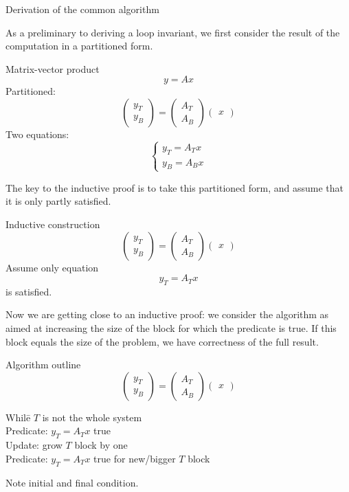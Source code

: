 {Derivation of the common algorithm}

As a preliminary to deriving a loop invariant, we first consider
the result of the computation in a partitioned form.

\begin{block}{Matrix-vector product}
  \[ y = Ax \]
  Partitioned:
  \[
  \begin{pmatrix}
    y_T\\ y_B
  \end{pmatrix}
  =
  \begin{pmatrix}
    A_T\\ A_B
  \end{pmatrix}
  \begin{pmatrix}
    x 
  \end{pmatrix}
  \]
  Two equations:
  \[
  \begin{cases}
    y_T = A_T x\\ y_B = A_B x
  \end{cases}
  \]
\end{block}

The key to the inductive proof is
to take this partitioned form, and assume that
it is only partly satisfied.

\begin{block}{Inductive construction}
  \[
  \begin{pmatrix}
    y_T\\ y_B
  \end{pmatrix}
  =
  \begin{pmatrix}
    A_T\\ A_B
  \end{pmatrix}
  \begin{pmatrix}
    x 
  \end{pmatrix}
  \]
Assume only equation
  \[ y_T = A_T x \]
  is satisfied.
\end{block}

Now we are getting close to an inductive proof:
we consider the algorithm as aimed at increasing
the size of the block for which the predicate is true.
If this block equals the size of the problem,
we have correctness of the full result.

\begin{block}{Algorithm outline}
  \[
  \begin{pmatrix}
    y_T\\ y_B
  \end{pmatrix}
  =
  \begin{pmatrix}
    A_T\\ A_B
  \end{pmatrix}
  \begin{pmatrix}
    x 
  \end{pmatrix}
  \]
  \begin{tabbing}
    Whil\=e $T$ is not the whole system\\
    \> Predicate: $y_T = A_T x$ true\\
    \> Update: grow $T$ block by one\\
    \> Predicate: $y_T = A_T x$ true for new/bigger $T$ block\\
  \end{tabbing}
  Note initial and final condition.
\end{block}

